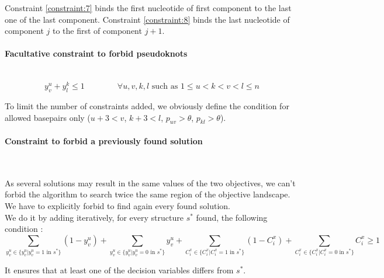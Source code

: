 \documentclass{article}
\begin{document}
Constraint \ref{constraint:7} binds the first nucleotide of first component to the last one of the last component. 
Constraint \ref{constraint:8} binds the last nucleotide of component $j$ to the first of component $j+1$.

\paragraph{Facultative constraint to forbid pseudoknots} ~
\begin{equation}\label{constraint:9}
	y^u_v + y^k_l \leq 1 \qquad \qquad \forall u,v,k,l \text{ such as } 1\leq u<k<v<l\leq n
\end{equation}

To limit the number of constraints added, we obviously define the condition for allowed basepairs only ($u + 3 <v$, $k + 3 <l$, $p_{uv} > \theta$, $p_{kl} > \theta$).



\paragraph{Constraint to forbid a previously found solution} ~ 

As several solutions may result in the same values of the two objectives, we can't forbid the algorithm to search twice the same region of the objective landscape.
We have to explicitly forbid to find again every found solution.\\
We do it by adding iteratively, for every structure $s^*$ found, the following condition :
\begin{equation}\label{constraint:10}
	\sum_{y^u_v \in \{ y^u_v  | y^u_v = 1 \text{ in } s^* \}} (1 - y^u_v) + \sum_{y^u_v \in \{ y^u_v  | y^u_v = 0 \text{ in } s^* \}} y^u_v +
	\sum_{C^x_i \in \{ C^x_i  | C^x_i = 1 \text{ in } s^* \}} (1 - C^x_i) + \sum_{C^x_i \in \{ C^x_i  |C^x_i = 0 \text{ in } s^* \}} C^x_i \geq 1
\end{equation}

It ensures that at least one of the decision variables differs from $s^*$.
\end{document}
